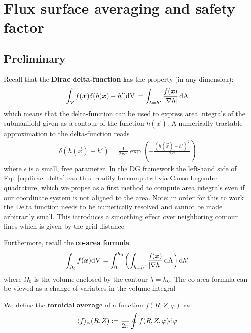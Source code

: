 \section{Flux surface averaging and safety factor}
\subsection{Preliminary}
Recall that the {\bf Dirac delta-function} has the property (in any dimension):
\begin{align} \label{eq:dirac_delta}
\int_V f({\boldsymbol{x}}) \delta(h({\boldsymbol{x}}) - h') \mathrm{dV}\, = \int_{h=h'} \frac{f({\boldsymbol{x}})}{|\nabla h|} \,\mathrm{dA}
\end{align}
which means that the delta-function can be used to express area integrals of the
submanifold given as a contour of the function $h(\vec x)$.
A numerically tractable approximation to the delta-function reads
\begin{align}\label{eq:delta}
\delta(h(\vec x)-h') = \frac{1}{2\pi \epsilon^2}
\exp\left( - \frac{\left(h(\vec x)-h'\right)^2}{2\epsilon^2}\right)
\end{align}
where $\epsilon$ is a small, free parameter.
In the DG framework the left-hand side
of Eq.~\eqref{eq:dirac_delta} can thus readily be computed
via Gauss-Legendre quadrature, which we propse as a first method to compute area
integrals even if our coordinate system is not aligned to the area.
Note: in order for this to work the Delta function needs to be numerically
resolved and cannot be made arbitrarily small.
This introduces a smoothing effect
over neighboring contour lines which is given by the grid distance.

Furthermore, recall the {\bf co-area formula}
\begin{align} \label{eq:coarea}
\int_{\Omega_0} f({\boldsymbol{x}}) \mathrm{dV}\, =
\int_0^{h_0} \left( \int_{h=h'} \frac{f({\boldsymbol{x}})}{|\nabla h|}  \,\mathrm{dA}  \right) \mathrm{d} h'
\end{align}
where $\Omega_0$ is the volume enclosed by the contour $h=h_0$.
The co-area formula can be viewed as a change of variables in the
volume integral.

We define the {\bf toroidal average} of a function $f(R,Z,\varphi)$ as
\begin{align} \label{eq:phi_average}
\langle f\rangle_\varphi(R,Z) := \frac{1}{2\pi}\oint f(R,Z,\varphi)\mathrm{d} \varphi
\end{align}

